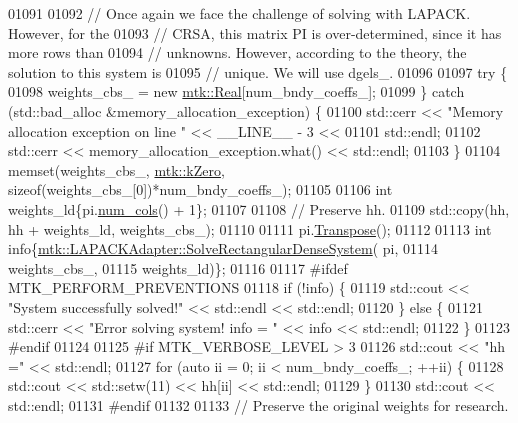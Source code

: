 \begin{DoxyCode}
{{01091 
01092   \textcolor{comment}{// Once again we face the challenge of solving with LAPACK. However, for the}
01093   \textcolor{comment}{// CRSA, this matrix PI is over-determined, since it has more rows than}
01094   \textcolor{comment}{// unknowns. However, according to the theory, the solution to this system is}
01095   \textcolor{comment}{// unique. We will use dgels\_.}
01096 
01097   \textcolor{keywordflow}{try} \{
01098     weights\_cbs\_ = \textcolor{keyword}{new} \hyperlink{group__c01-roots_gac080bbbf5cbb5502c9f00405f894857d}{mtk::Real}[num\_bndy\_coeffs\_];
01099   \} \textcolor{keywordflow}{catch} (std::bad\_alloc &memory\_allocation\_exception) \{
01100     std::cerr << \textcolor{stringliteral}{"Memory allocation exception on line "} << \_\_LINE\_\_ - 3 <<
01101       std::endl;
01102     std::cerr << memory\_allocation\_exception.what() << std::endl;
01103   \}
01104   memset(weights\_cbs\_, \hyperlink{group__c01-roots_ga59a451a5fae30d59649bcda274fea271}{mtk::kZero}, \textcolor{keyword}{sizeof}(weights\_cbs\_[0])*num\_bndy\_coeffs\_);
01105 
01106   \textcolor{keywordtype}{int} weights\_ld\{pi.\hyperlink{classmtk_1_1DenseMatrix_a41747502d468c6728a4be31501b16e0e}{num\_cols}() + 1\};
01107 
01108   \textcolor{comment}{// Preserve hh.}
01109   std::copy(hh, hh + weights\_ld, weights\_cbs\_);
01110 
01111   pi.\hyperlink{classmtk_1_1DenseMatrix_a71d9c07ca66e88d97d1fd5012f43138b}{Transpose}();
01112 
01113   \textcolor{keywordtype}{int} info\{\hyperlink{classmtk_1_1LAPACKAdapter_a380f148ffdf96bae2f79ae28f1a6560c}{mtk::LAPACKAdapter::SolveRectangularDenseSystem}(
      pi,
01114                                                            weights\_cbs\_,
01115                                                            weights\_ld)\};
01116 
01117 \textcolor{preprocessor}{  #ifdef MTK\_PERFORM\_PREVENTIONS}
01118   \textcolor{keywordflow}{if} (!info) \{
01119     std::cout << \textcolor{stringliteral}{"System successfully solved!"} << std::endl << std::endl;
01120   \} \textcolor{keywordflow}{else} \{
01121     std::cerr << \textcolor{stringliteral}{"Error solving system! info = "} << info << std::endl;
01122   \}
01123 \textcolor{preprocessor}{  #endif}
01124 
01125 \textcolor{preprocessor}{  #if MTK\_VERBOSE\_LEVEL > 3}
01126   std::cout << \textcolor{stringliteral}{"hh ="} << std::endl;
01127   \textcolor{keywordflow}{for} (\textcolor{keyword}{auto} ii = 0; ii < num\_bndy\_coeffs\_; ++ii) \{
01128     std::cout << std::setw(11) << hh[ii] << std::endl;
01129   \}
01130   std::cout << std::endl;
01131 \textcolor{preprocessor}{  #endif}
01132 
01133   \textcolor{comment}{// Preserve the original weights for research.}
}}
\end{DoxyCode}
